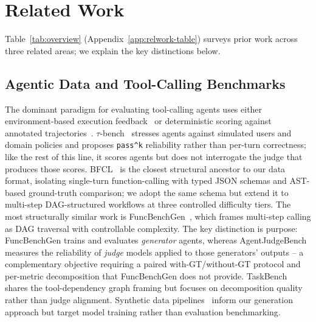\section{Related Work}
Table~\ref{tab:overview} (Appendix~\ref{app:relwork-table}) surveys prior work across three related areas; we explain the key distinctions below.

\subsection{Agentic Data and Tool-Calling Benchmarks}
The dominant paradigm for evaluating tool-calling agents uses either environment-based execution feedback~\citep{zhou2024webarena,drouin2024workarena,trivedi2024appworld,yao2024taubench} or deterministic scoring against annotated trajectories~\citep{deng2023mind2web,xu2025agenttrek,patil2025bfcl}. $\tau$-bench~\citep{yao2024taubench} stresses agents against simulated users and domain policies and proposes \texttt{pass\textasciicircum k} reliability rather than per-turn correctness; like the rest of this line, it scores agents but does not interrogate the judge that produces those scores. BFCL~\citep{patil2025bfcl} is the closest structural ancestor to our data format, isolating single-turn function-calling with typed JSON schemas and AST-based ground-truth comparison; we adopt the same schema but extend it to multi-step DAG-structured workflows at three controlled difficulty tiers. The most structurally similar work is FuncBenchGen~\citep{maekawa2025funcbenchgen}, which frames multi-step calling as DAG traversal with controllable complexity. The key distinction is purpose: FuncBenchGen trains and evaluates \emph{generator} agents, whereas AgentJudgeBench measures the reliability of \emph{judge} models applied to those generators' outputs -- a complementary objective requiring a paired with-GT/without-GT protocol and per-metric decomposition that FuncBenchGen does not provide. TaskBench~\citep{shen2024taskbench} shares the tool-dependency graph framing but focuses on decomposition quality rather than judge alignment. Synthetic data pipelines~\citep{wang2023selfinstruct,xu2025magpie,cui2024ultrafeedback} inform our generation approach but target model training rather than evaluation benchmarking.

